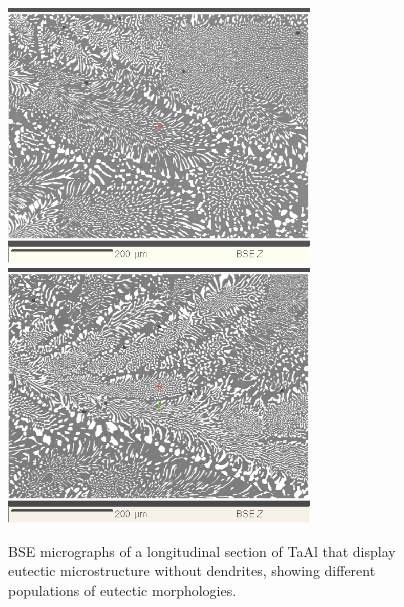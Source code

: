 %
%
\begin{figure}[htbp]
\begin{center}
\includegraphics[width=8cm]{auto8_ii}
\includegraphics[width=8cm]{auto8_iii}
\caption{ BSE micrographs of a longitudinal section of TaAl that display eutectic microstructure without dendrites, showing different populations of eutectic morphologies.}
\label{fig:auto8}
\end{center}
\end{figure}
%

